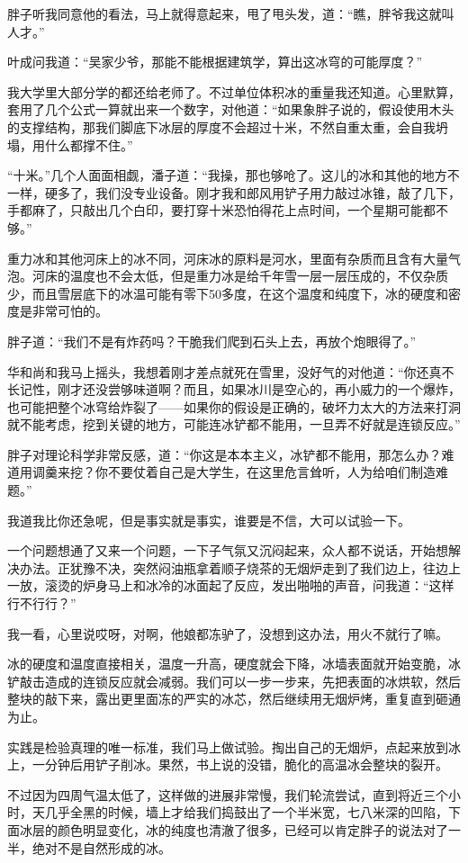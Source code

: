 胖子听我同意他的看法，马上就得意起来，甩了甩头发，道：“瞧，胖爷我这就叫人才。”

叶成问我道：“吴家少爷，那能不能根据建筑学，算出这冰穹的可能厚度？”

我大学里大部分学的都还给老师了。不过单位体积冰的重量我还知道。心里默算，套用了几个公式一算就出来一个数字，对他道：“如果象胖子说的，假设使用木头的支撑结构，那我们脚底下冰层的厚度不会超过十米，不然自重太重，会自我坍塌，用什么都撑不住。”

“十米。”几个人面面相觑，潘子道：“我操，那也够呛了。这儿的冰和其他的地方不一样，硬多了，我们没专业设备。刚才我和郎风用铲子用力敲过冰锥，敲了几下，手都麻了，只敲出几个白印，要打穿十米恐怕得花上点时间，一个星期可能都不够。”

重力冰和其他河床上的冰不同，河床冰的原料是河水，里面有杂质而且含有大量气泡。河床的温度也不会太低，但是重力冰是给千年雪一层一层压成的，不仅杂质少，而且雪层底下的冰温可能有零下50多度，在这个温度和纯度下，冰的硬度和密度是非常可怕的。

胖子道：“我们不是有炸药吗？干脆我们爬到石头上去，再放个炮眼得了。”

华和尚和我马上摇头，我想着刚才差点就死在雪里，没好气的对他道：“你还真不长记性，刚才还没尝够味道啊？而且，如果冰川是空心的，再小威力的一个爆炸，也可能把整个冰穹给炸裂了——如果你的假设是正确的，破坏力太大的方法来打洞就不能考虑，挖到关键的地方，可能连冰铲都不能用，一旦弄不好就是连锁反应。”

胖子对理论科学非常反感，道：“你这是本本主义，冰铲都不能用，那怎么办？难道用调羹来挖？你不要仗着自己是大学生，在这里危言耸听，人为给咱们制造难题。”

我道我比你还急呢，但是事实就是事实，谁要是不信，大可以试验一下。

一个问题想通了又来一个问题，一下子气氛又沉闷起来，众人都不说话，开始想解决办法。正犹豫不决，突然闷油瓶拿着顺子烧茶的无烟炉走到了我们边上，往边上一放，滚烫的炉身马上和冰冷的冰面起了反应，发出啪啪的声音，问我道：“这样行不行行？”

我一看，心里说哎呀，对啊，他娘都冻驴了，没想到这办法，用火不就行了嘛。

冰的硬度和温度直接相关，温度一升高，硬度就会下降，冰墙表面就开始变脆，冰铲敲击造成的连锁反应就会减弱。我们可以一步一步来，先把表面的冰烘软，然后整块的敲下来，露出更里面冻的严实的冰芯，然后继续用无烟炉烤，重复直到砸通为止。

实践是检验真理的唯一标准，我们马上做试验。掏出自己的无烟炉，点起来放到冰上，一分钟后用铲子削冰。果然，书上说的没错，脆化的高温冰会整块的裂开。

不过因为四周气温太低了，这样做的进展非常慢，我们轮流尝试，直到将近三个小时，天几乎全黑的时候，墙上才给我们捣鼓出了一个半米宽，七八米深的凹陷，下面冰层的颜色明显变化，冰的纯度也清澈了很多，已经可以肯定胖子的说法对了一半，绝对不是自然形成的冰。

